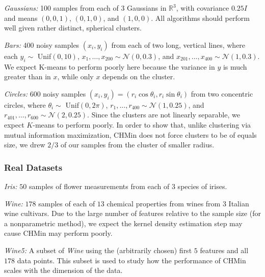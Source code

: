 \documentclass{article} %
\newcommand{\R}{{\mathbb{R}}}
\begin{document}
\emph{Gaussians:}
100 samples from each of $3$ Gaussians in $\R^3$, with covariance $0.25I$ and
means $(0, 0, 1)$, $(0, 1, 0)$, and $(1, 0, 0)$. All algorithms should perform
well given rather distinct, spherical clusters.

\emph{Bars:}
400 noisy samples $(x_i, y_i)$ from each of two long, vertical lines, where
each $y_i \sim$ Unif$(0, 10)$, $x_1,\dots,x_{200} \sim \mathcal{N}(0, 0.3)$,
and $x_{201},\dots,x_{400} \sim \mathcal{N}(1, 0.3)$. We expect K-means to
perform poorly here because the variance in $y$ is much greater than in $x$,
while only $x$ depends on the cluster.

\emph{Circles:} 600 noisy samples
$(x_i, y_i) = (r_i\cos \theta_i, r_i \sin \theta_i)$ from two concentric
circles, where $\theta_i \sim$ Unif$(0, 2\pi)$,
$r_1,\dots,r_{400} \sim \mathcal{N}(1, 0.25)$, and
$r_{401},\dots,r_{600} \sim \mathcal{N}(2, 0.25)$. Since the clusters are not
linearly separable, we expect $K$-means to perform poorly. In order to show
that, unlike clustering via mutual information maximization, CHMin does not
force clusters to be of equals size, we drew $2/3$ of our samples from the
cluster of smaller radius.

\subsubsection{Real Datasets}
\emph{Iris:} $50$ samples of flower measurements from each of $3$ species of
irises.

\emph{Wine:} $178$ samples of each of $13$ chemical properties from wines from
$3$ Italian wine cultivars. Due to the large number of features relative to the
sample size (for a nonparametric method), we expect the kernel density
estimation step may cause CHMin may perform poorly.

\emph{Wine5:} A subset of \emph{Wine} using the (arbitrarily chosen) first $5$
features and all $178$ data points. This subset is used to study how the
performance of CHMin scales with the dimension of the data.
\end{document}
